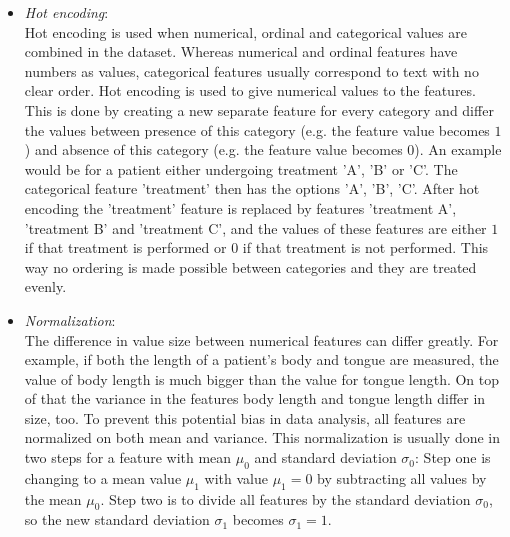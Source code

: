 	\begin{itemize}
		\item \textit{Hot encoding}:\\
		Hot encoding is used when numerical, ordinal and categorical values are combined in the dataset. Whereas numerical and ordinal features have numbers as values, categorical features usually correspond to text with no clear order. Hot encoding is used to give numerical values to the features. This is done by creating a new separate feature for every category and differ the values between presence of this category (e.g. the feature value becomes $1$) and absence of this category (e.g. the feature value becomes $0$). An example would be for a patient either undergoing treatment 'A', 'B' or 'C'. The categorical feature 'treatment' then has the options {'A', 'B', 'C'}. After hot encoding the 'treatment' feature is replaced by features 'treatment A', 'treatment B' and 'treatment C', and the values of these features are either $1$ if that treatment is performed or $0$ if that treatment is not performed. This way no ordering is made possible between categories and they are treated evenly.
		\item \textit{Normalization}:\\
		The difference in value size between numerical features can differ greatly. For example, if both the length of a patient's body and tongue are measured, the value of body length is much bigger than the value for tongue length. On top of that the variance in the features body length and tongue length differ in size, too. To prevent this potential bias in data analysis, all features are normalized on both mean and variance. This normalization is usually done in two steps for a feature with mean $\mu_0$ and standard deviation $\sigma_0$: Step one is changing to a mean value $\mu_1$ with value $\mu_1 = 0$ by subtracting all values by the mean $\mu_0$. Step two is to divide all features by the standard deviation $\sigma_0$, so the new standard deviation $\sigma_1$ becomes $\sigma_1 = 1$.
	\end{itemize}


